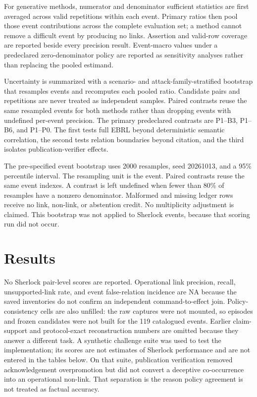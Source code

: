 \documentclass[conference]{IEEEtran}
\newcommand{\NA}{\textsc{NA}}
\begin{document}
For generative methods, numerator and denominator sufficient statistics are first averaged across valid repetitions within each event. Primary ratios then pool those event contributions across the complete evaluation set; a method cannot remove a difficult event by producing no links. Assertion and valid-row coverage are reported beside every precision result. Event-macro values under a predeclared zero-denominator policy are reported as sensitivity analyses rather than replacing the pooled estimand.

Uncertainty is summarized with a scenario- and attack-family-stratified bootstrap that resamples events and recomputes each pooled ratio. Candidate pairs and repetitions are never treated as independent samples. Paired contrasts reuse the same resampled events for both methods rather than dropping events with undefined per-event precision. The primary predeclared contrasts are P1--B3, P1--B6, and P1--P0. The first tests full EBRL beyond deterministic semantic correlation, the second tests relation boundaries beyond citation, and the third isolates publication-verifier effects.

The pre-specified event bootstrap uses 2000 resamples, seed 20261013, and a 95\% percentile interval. The resampling unit is the event. Paired contrasts reuse the same event indexes. A contrast is left undefined when fewer than 80\% of resamples have a nonzero denominator. Malformed and missing ledger rows receive no link, non-link, or abstention credit. No multiplicity adjustment is claimed. This bootstrap was not applied to Sherlock events, because that scoring run did not occur.

\section{Results}

No Sherlock pair-level scores are reported. Operational link precision, recall, unsupported-link rate, and event false-relation incidence are \NA{} because the saved inventories do not confirm an independent command-to-effect join. Policy-consistency cells are also unfilled: the raw captures were not mounted, so episodes and frozen candidates were not built for the 119 catalogued events. Earlier claim-support and protocol-exact reconstruction numbers are omitted because they answer a different task. A synthetic challenge suite was used to test the implementation; its scores are not estimates of Sherlock performance and are not entered in the tables below. On that suite, publication verification removed acknowledgement overpromotion but did not convert a deceptive co-occurrence into an operational non-link. That separation is the reason policy agreement is not treated as factual accuracy.
\end{document}
